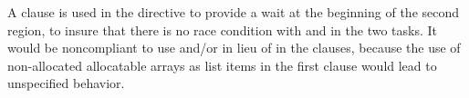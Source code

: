 A  clause is used in the  directive to provide a wait at the beginning of the second 
 region, to insure that there is no race condition with  and  in the two tasks.
It would be noncompliant to use  and/or  in lieu of  in the  clauses, 
because the use of non-allocated allocatable arrays as list items in the first  clause would 
lead to unspecified behavior. 


